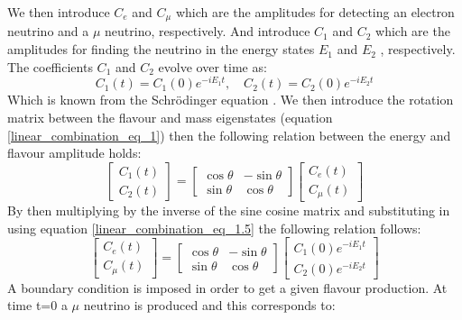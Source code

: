 We then introduce $C_e$ and $C_\mu$ which are the amplitudes for detecting an electron neutrino and a $\mu$ neutrino, respectively. And introduce $C_1$ and $C_2$ which are the amplitudes for finding the neutrino in the energy states $E_1$ and $E_2$ , respectively. The coefficients $C_1$ and $C_2$ evolve over time as:
\begin{equation}
    C_1(t) = C_1(0)e^{-iE_1t}, \quad  C_2(t) = C_2(0)e^{-iE_2t}
    \label{linear_combination_eq_1.5}
\end{equation}
Which is known from the Schrödinger equation \cite{sassaroli1999neutrino} \cite{griffiths2008book}\cite{griffiths2008neutrinoOscillations}. We then introduce the rotation matrix between the flavour and mass eigenstates (equation \ref{linear_combination_eq_1}) then the following relation between the energy and flavour amplitude holds:
\begin{equation}
    \begin{bmatrix}
        C_1(t) \\
        C_2(t)
    \end{bmatrix}
    =
    \begin{bmatrix}
        \cos\theta & -\sin\theta \\
        \sin\theta & \cos\theta 
    \end{bmatrix}
        \begin{bmatrix}
        C_e(t) \\
        C_\mu(t)
    \end{bmatrix}
    \label{linear_combination_eq_2}
\end{equation}
By then multiplying by the inverse of the sine cosine matrix and substituting in using equation \ref{linear_combination_eq_1.5} the following relation follows:
\begin{equation}
    \begin{bmatrix}
        C_e(t) \\
        C_\mu(t)
    \end{bmatrix}
    =
    \begin{bmatrix}
        \cos\theta & -\sin\theta \\
        \sin\theta & \cos\theta 
    \end{bmatrix}
        \begin{bmatrix}
        C_1(0)e^{-iE_1t} \\
        C_2(0)e^{-iE_2t}
    \end{bmatrix}
    \label{linear_combination_eq_3}
\end{equation}
A boundary condition is imposed in order to get a given flavour production. At time t=0 a $\mu$ neutrino is produced and this corresponds to:
